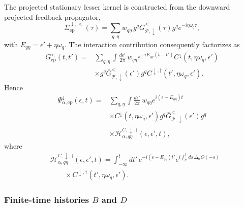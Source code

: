 \documentclass[
 reprint,
 superscriptaddress,
 amsmath,amssymb,
 aps,prb,
 longbibliography,
 floatfix
]{revtex4-2}
\newcommand{\ep}{\mathrm{ep}}
\newcommand{\barSigma}{\overline{\Sigma}}
\begin{document}
The projected stationary lesser kernel is constructed from the downward projected feedback propagator,
\begin{equation*}
\barSigma_{\ep}^{\downarrow,<}(\tau)
=
\sum_{q,\eta}
w_{q\eta}\,
g^q
\bar G_{\mathcal P,\downarrow}^{<}(\tau)
g^q
e^{-i\eta\omega_q\tau},
\end{equation*}
with
$E_{q\eta}
=
\epsilon'+\eta\omega_q$. The interaction contribution consequently factorizes as
\begin{equation*}
\begin{aligned}
G_{\ep}^<(t,t')
={}&
\sum_{q,\eta}
\int\frac{d\epsilon'}{2\pi}\,
w_{q\eta}
e^{-iE_{q\eta}(t-t')}
C^\downarrow
(t,\eta\omega_q,\epsilon')
\\
&\times
g^q
\bar G_{\mathcal P,\downarrow}^{<}(\epsilon')
g^q C^{\downarrow,\dagger}
(t',\eta\omega_q,\epsilon').
\end{aligned}
\end{equation*}
Hence
\begin{equation*}
\begin{aligned}
\Psi_{\alpha,\ep}^\downarrow(\epsilon,t)
={}&
\sum_{q,\eta}
\int\frac{d\epsilon'}{2\pi}\,
w_{q\eta}
e^{i(\epsilon-E_{q\eta})t}
\\
&\times
C^\downarrow
(t,\eta\omega_q,\epsilon')
g^q
\bar G_{\mathcal P,\downarrow}^{<}(\epsilon')
g^q
\\
&\times
\mathcal H_{\alpha,q\eta}^{C,\downarrow,\dagger}
(\epsilon,\epsilon',t),
\end{aligned}
\end{equation*}
where
\begin{align*}
&\mathcal H_{\alpha,q\eta}^{C,\downarrow,\dagger}
(\epsilon,\epsilon',t)
=
\int_{-\infty}^{t}dt'\,
e^{-i(\epsilon-E_{q\eta})t'}
e^{i\int_{t'}^t ds\,
\Delta_\alpha\Theta(-s)}
\\
&\qquad\times
C^{\downarrow,\dagger}
(t',\eta\omega_q,\epsilon').
\end{align*}

\subsubsection{Finite-time histories $B$ and $D$}
\end{document}
